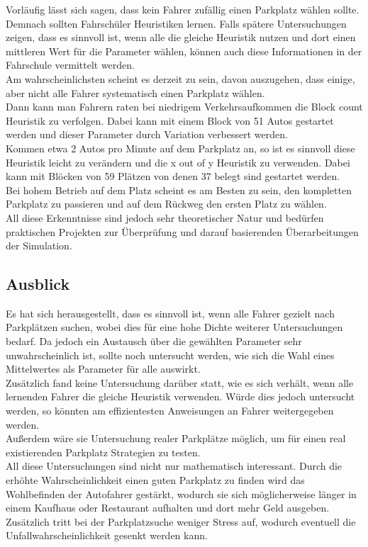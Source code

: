 Vorläufig lässt sich sagen, dass kein Fahrer zufällig einen Parkplatz wählen sollte. Demnach sollten Fahrschüler Heuristiken lernen. Falls spätere Untersuchungen zeigen, dass es sinnvoll ist, wenn alle die gleiche Heuristik nutzen und dort einen mittleren Wert für die Parameter wählen, können auch diese Informationen in der Fahrschule vermittelt werden.\\
Am wahrscheinlichsten scheint es derzeit zu sein, davon auszugehen, dass einige, aber nicht alle Fahrer systematisch einen Parkplatz wählen. \\
 Dann kann man Fahrern raten bei niedrigem Verkehrsaufkommen die Block count Heuristik zu verfolgen. Dabei kann mit einem Block von 51 Autos gestartet werden und dieser Parameter durch Variation verbessert werden.\\
 Kommen etwa 2 Autos pro Minute auf dem Parkplatz an, so ist es sinnvoll diese Heuristik leicht zu verändern und die x out of y Heuristik zu verwenden. Dabei kann mit Blöcken von 59 Plätzen von denen 37 belegt sind gestartet werden.\\
 Bei hohem Betrieb auf dem Platz scheint es am Besten zu sein, den kompletten Parkplatz zu passieren und auf dem Rückweg den ersten Platz zu wählen.\\
All diese Erkenntnisse sind jedoch sehr theoretischer Natur und bedürfen praktischen Projekten zur Überprüfung und darauf basierenden Überarbeitungen der Simulation. 
 
 \subsection{Ausblick}

Es hat sich herausgestellt, dass es sinnvoll ist, wenn alle Fahrer gezielt nach Parkplätzen suchen, wobei dies für eine hohe Dichte weiterer Untersuchungen bedarf. Da jedoch ein Austausch über die gewählten Parameter sehr unwahrscheinlich ist, sollte noch untersucht werden, wie sich die Wahl eines Mittelwertes als Parameter für alle auswirkt.\\
Zusätzlich fand keine Untersuchung darüber statt, wie es sich verhält, wenn alle lernenden Fahrer die gleiche Heuristik verwenden. Würde dies jedoch untersucht werden, so könnten am effizientesten Anweisungen an Fahrer weitergegeben werden. \\
Außerdem wäre sie Untersuchung realer Parkplätze möglich, um für einen real existierenden Parkplatz Strategien zu testen.\\
All diese Untersuchungen sind nicht nur mathematisch interessant. Durch die erhöhte Wahrscheinlichkeit einen guten Parkplatz zu finden wird das Wohlbefinden der Autofahrer gestärkt, wodurch sie sich möglicherweise länger in einem Kaufhaus oder Restaurant aufhalten und dort mehr Geld ausgeben. Zusätzlich tritt bei der Parkplatzsuche weniger Stress auf, wodurch eventuell die Unfallwahrscheinlichkeit gesenkt werden kann.
